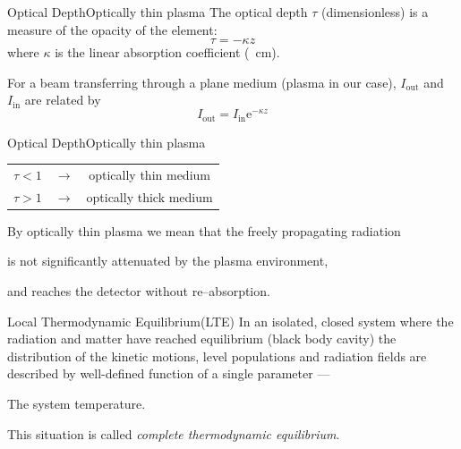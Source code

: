\documentclass[final]{beamer}
\begin{document}
\newcommand{\opticaldepth}{Optical Depth}
\begin{frame}{\opticaldepth}{Optically thin plasma}
  The optical depth $\tau$ (dimensionless) is a measure of the opacity of the element:
  \begin{equation*}
    \tau=-\kappa z
  \end{equation*}
  where $\kappa$ is the linear absorption coefficient (\si{\per\cm}).

  For a beam transferring through a plane medium (plasma in our case), $I_\text{out}$ and $I_\text{in}$ are related by
  \begin{equation*}
    I_\text{out} = I_\text{in}\mathrm{e}^{-\kappa z} %
  \end{equation*}

\begin{figure}
    \centering
    
\end{figure}

\end{frame}
\begin{frame}{\opticaldepth}{Optically thin plasma}
 \begin{center}
\begin{tabular}{ c c c }
  $\tau<1$ & $\longrightarrow$ & optically thin medium\\ 
  $\tau>1$ & $\longrightarrow$ & optically thick medium
\end{tabular}
\end{center}
By optically thin plasma we mean that the freely propagating radiation

is not significantly attenuated by the plasma environment, 

and reaches the detector without re--absorption.
\end{frame}
\newcommand{\lte}{Local Thermodynamic Equilibrium(LTE)}
\begin{frame}{\lte}
  In an isolated, closed system where the radiation and matter have reached equilibrium (black body cavity) the distribution of the kinetic motions, level populations and radiation fields are described by well-defined function of a single parameter ---

  The system temperature.

  This situation is called \emph{complete thermodynamic equilibrium}.
\end{frame}
\end{document}

